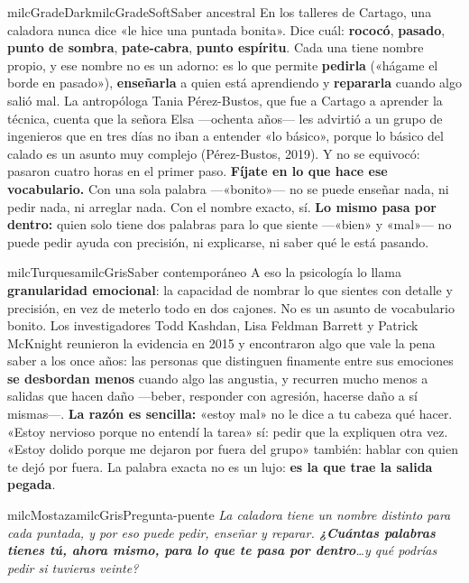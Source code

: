 \documentclass[11pt,letterpaper]{article}
\begin{document}
\begin{softbox}{milcGradeDark}{milcGradeSoft}{Saber ancestral}
En los talleres de Cartago, una caladora nunca dice «le hice una puntada bonita». Dice cuál: \textbf{rococó}, \textbf{pasado}, \textbf{punto de sombra}, \textbf{pate-cabra}, \textbf{punto espíritu}. Cada una tiene nombre propio, y ese nombre no es un adorno: es lo que permite \textbf{pedirla} («hágame el borde en pasado»), \textbf{enseñarla} a quien está aprendiendo y \textbf{repararla} cuando algo salió mal. La antropóloga Tania Pérez-Bustos, que fue a Cartago a aprender la técnica, cuenta que la señora Elsa ---ochenta años--- les advirtió a un grupo de ingenieros que en tres días no iban a entender «lo básico», porque lo básico del calado es un asunto muy complejo (Pérez-Bustos, 2019). Y no se equivocó: pasaron cuatro horas en el primer paso. \textbf{Fíjate en lo que hace ese vocabulario.} Con una sola palabra ---«bonito»--- no se puede enseñar nada, ni pedir nada, ni arreglar nada. Con el nombre exacto, sí. \textbf{Lo mismo pasa por dentro:} quien solo tiene dos palabras para lo que siente ---«bien» y «mal»--- no puede pedir ayuda con precisión, ni explicarse, ni saber qué le está pasando.
\end{softbox}

\begin{softbox}{milcTurquesa}{milcGris}{Saber contemporáneo}
A eso la psicología lo llama \textbf{granularidad emocional}: la capacidad de nombrar lo que sientes con detalle y precisión, en vez de meterlo todo en dos cajones. No es un asunto de vocabulario bonito. Los investigadores Todd Kashdan, Lisa Feldman Barrett y Patrick McKnight reunieron la evidencia en 2015 y encontraron algo que vale la pena saber a los once años: las personas que distinguen finamente entre sus emociones \textbf{se desbordan menos} cuando algo las angustia, y recurren mucho menos a salidas que hacen daño ---beber, responder con agresión, hacerse daño a sí mismas---. \textbf{La razón es sencilla:} «estoy mal» no le dice a tu cabeza qué hacer. «Estoy nervioso porque no entendí la tarea» sí: pedir que la expliquen otra vez. «Estoy dolido porque me dejaron por fuera del grupo» también: hablar con quien te dejó por fuera. La palabra exacta no es un lujo: \textbf{es la que trae la salida pegada}.
\end{softbox}

\begin{softbox}{milcMostaza}{milcGris}{Pregunta-puente}
\textit{La caladora tiene un nombre distinto para cada puntada, y por eso puede pedir, enseñar y reparar. \textbf{¿Cuántas palabras tienes tú, ahora mismo, para lo que te pasa por dentro}\ldots y qué podrías pedir si tuvieras veinte?}
\end{softbox}
\end{document}

